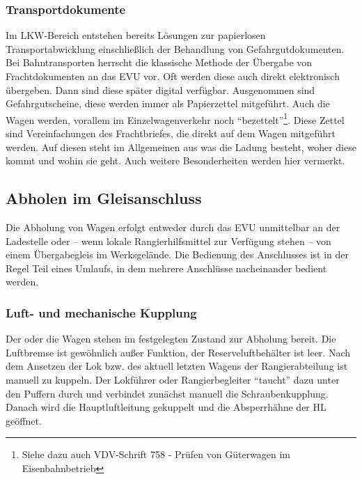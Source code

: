 \subsubsection{Transportdokumente}\label{sec:Transdoc}
Im LKW-Bereich entstehen bereits Lösungen zur papierlosen Transportabwicklung einschließlich der Behandlung von Gefahrgutdokumenten. Bei Bahntransporten herrscht die klassische Methode der Übergabe von Frachtdokumenten an das \acrshort{EVU} vor. Oft werden diese auch direkt elektronisch übergeben. Dann sind diese später digital verfügbar. Ausgenommen sind Gefahrgutscheine, diese werden immer als Papierzettel mitgeführt. Auch die Wagen werden, vorallem im Einzelwagenverkehr noch "`bezettelt"'\footnote{Siehe dazu auch VDV-Schrift 758 - Prüfen von Güterwagen im Eisenbahnbetrieb}. Diese Zettel sind Vereinfachungen des Frachtbriefes, die direkt auf dem Wagen mitgeführt werden. Auf diesen steht im Allgemeinen aus was die Ladung besteht, woher diese kommt und wohin sie geht. Auch weitere Besonderheiten werden hier vermerkt.
\subsection{Abholen im Gleisanschluss}
Die Abholung von Wagen erfolgt entweder durch das \acrshort{EVU} unmittelbar an der Ladestelle oder -- wenn lokale Rangierhilfsmittel zur Verfügung stehen -- von einem Übergabegleis im Werksgelände. Die Bedienung des Anschlusses ist in der Regel Teil eines Umlaufs, in dem mehrere Anschlüsse nacheinander bedient werden.
\subsubsection{Luft- und mechanische Kupplung}\label{sec:LuftumechKup}
Der oder die Wagen stehen im festgelegten Zustand zur Abholung bereit. Die Luftbremse ist gewöhnlich außer Funktion, der Reserveluftbehälter ist leer. Nach dem Ansetzen der Lok bzw. des aktuell letzten Wagens der Rangierabteilung ist manuell zu kuppeln. Der Lokführer oder Rangierbegleiter "`taucht"' dazu unter den Puffern durch und verbindet zunächst manuell die Schraubenkupplung. Danach wird die Hauptluftleitung gekuppelt und die Absperrhähne der \acrshort{HL} geöffnet. %
